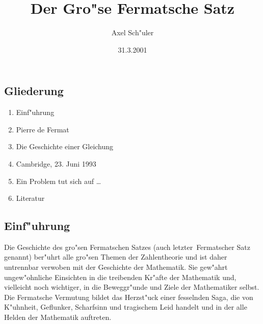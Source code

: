 \documentclass[11pt]{article}
\title{Der Gro"se Fermatsche Satz\kosemnetlicensemark}
\author{Axel Sch"uler}
\date{31.3.2001}
\begin{document}
\maketitle
\subsection*{Gliederung}
\begin{enumerate}
\item Einf"uhrung
\item Pierre de Fermat
\item Die Geschichte einer Gleichung
\item Cambridge, 23. Juni 1993
\item Ein Problem tut sich auf \dots
\item Literatur
\end{enumerate}

\subsection*{Einf"uhrung}
Die Geschichte des gro"sen Fermatschen Satzes (auch \glqq letzter\grqq\ Fermatscher
Satz genannt) ber"uhrt alle gro"sen Themen der Zahlentheorie und ist daher untrennbar  verwoben mit der Geschichte der Mathematik.
Sie gew"ahrt ungew"ohnliche Einsichten in die treibenden Kr"afte der Mathematik und, vielleicht noch wichtiger,
in die Beweggr"unde  und Ziele der Mathematiker selbst. Die Fermatsche Vermutung
bildet das Herzst"uck einer fesselnden Saga, die von K"uhnheit, Geflunker, Scharfsinn und tragischem Leid handelt und in der alle Helden der 
Mathematik auftreten.
\end{document}
